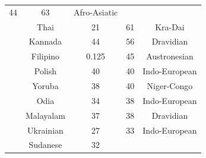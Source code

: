 {\begin{tabular}{|c|c|c|c|c|}
44 &
	

63 &
	

Afro-Asiatic \\

	\thetablecount\stepcounter{tablecount} &
Thai &
	

21 &
	

61 &
	

Kra-Dai \\
	\thetablecount\stepcounter{tablecount} &

Kannada &
	

44 &
	

56 &
	

Dravidian \\

	\thetablecount\stepcounter{tablecount} &
Filipino &
	

0.125 &
	

45 &
	

Austronesian \\

	\thetablecount\stepcounter{tablecount} &
Polish &
	

40 &
	

40 &
	

Indo-European \\
	\thetablecount\stepcounter{tablecount} &

Yoruba &
	

38 &
	

40 &
	

Niger-Congo \\
	\thetablecount\stepcounter{tablecount} &

Odia &
	

34 &
	

38 &
	

Indo-European \\

	\thetablecount\stepcounter{tablecount} &
Malayalam &
	

37 &
	

38 &
	

Dravidian \\
	\thetablecount\stepcounter{tablecount} &

Ukrainian &
	

27 &
	

33 &
	

Indo-European \\
	\thetablecount\stepcounter{tablecount} &

Sudanese &
	

32 &
	


\end{tabular}}
